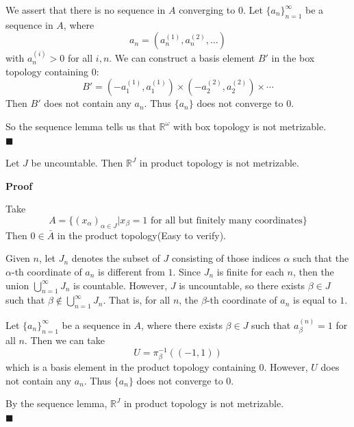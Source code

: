 \documentclass[main.tex]{subfiles}
\begin{document}
We assert that there is no sequence in $A$ converging to $0$. Let $\{a_n \}_{n=1}^{\infty}$ be a sequence in $A$, where 
\begin{equation}
    a_n = (a_n^{(1)}, a_n^{(2)}, \ldots)
\end{equation}
with $a_n^{(i)} > 0$ for all $i, n$. We can construct a basis element $B'$ in the box topology containing $0$: 
\begin{equation}
    B' = (-a_1^{(1)}, a_1^{(1)}) \times (-a_2^{(2)}, a_2^{(2)}) \times \cdots
\end{equation}
Then $B'$ does not contain any $a_n$. Thus $\{a_n\}$ does not converge to $0$. 
\par So the sequence lemma tells us that $\mathbb{R}^{\omega}$ with box topology is not metrizable. 
\mbox{} \\ \null \hfill $\blacksquare$ 


\begin{property}
    Let $J$ be uncountable. Then $\mathbb{R}^{J}$ in product topology is not metrizable. 
\end{property}
\par \noindent \textbf{Proof} 
\par Take 
\begin{equation}
    A = \{(x_\alpha)_{\alpha \in J}| x_{\beta} = 1 \text{ for all but finitely many coordinates}\}
\end{equation}
Then $0 \in \bar{A}$ in the product topology(Easy to verify). 
\par Given $n$, let $J_n$ denotes the subset of $J$ consisting of those indices $\alpha$ such that the $\alpha$-th coordinate of $a_n$ is different from $1$. Since $J_n$ is finite for each $n$, then the union $\bigcup_{n=1}^{\infty} J_n$ is countable. However, $J$ is uncountable, so there exists $\beta \in J$ such that $\beta \notin \bigcup_{n=1}^{\infty} J_n$. That is, for all $n$, the $\beta$-th coordinate of $a_n$ is equal to $1$. 
\par Let $\{a_n\}_{n=1}^{\infty}$ be a sequence in $A$, where there exists $\beta \in J$ such that $a_{\beta}^{(n)} = 1$ for all $n$. Then we can take 
\begin{equation}
    U = \pi_{\beta}^{-1}((- 1, 1))
\end{equation}
which is a basis element in the product topology containing $0$. However, $U$ does not contain any $a_n$. Thus $\{a_n\}$ does not converge to $0$.
\par By the sequence lemma, $\mathbb{R}^{J}$ in product topology is not metrizable.
\mbox{} \\ \null \hfill $\blacksquare$ 
\end{document}
